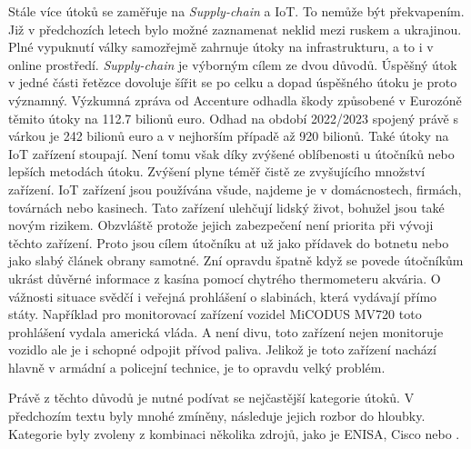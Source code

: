 Stále více útoků se zaměřuje na \textit{Supply-chain} a \ac{IoT}.
To nemůže být překvapením.
Již v předchozích letech bylo možné zaznamenat neklid mezi ruskem a ukrajinou.
Plné vypuknutí války samozřejmě zahrnuje útoky na infrastrukturu, a to i v online prostředí.
\textit{Supply-chain} je výborným cílem ze dvou důvodů.
Úspěšný útok v jedné části řetězce dovoluje šířit se po celku a dopad úspěšného útoku je proto významný.
Výzkumná zpráva od Accenture\cite{accenture_supply-chain-disruption} odhadla škody způsobené v Eurozóně těmito útoky na 112.7 bilionů euro.
Odhad na období 2022/2023 spojený právě s várkou je 242 bilionů euro a v nejhorším případě až 920 bilionů.
Také útoky na \ac{IoT} zařízení stoupají.
Není tomu však díky zvýšené oblíbenosti u útočníků nebo lepších metodách útoku.
Zvýšení plyne téměř čistě ze zvyšujícího množství zařízení.
\ac{IoT} zařízení jsou používána všude, najdeme je v domácnostech, firmách, továrnách nebo kasinech.
Tato zařízení ulehčují lidský život, bohužel jsou také novým rizikem.
Obzvláště protože jejich zabezpečení není priorita při vývoji těchto zařízení.
Proto jsou cílem útočníku at už jako přídavek do botnetu nebo jako slabý článek obrany samotné.
Zní opravdu špatně když se povede útočníkům ukrást důvěrné informace z kasína pomocí chytrého thermometeru akvária\cite{casino_thermometer}.
O vážnosti situace svědčí i veřejná prohlášení o slabinách, která vydávají přímo státy.
Například pro monitorovací zařízení vozidel MiCODUS MV720 toto prohlášení vydala americká vláda\cite{america_gov_advisories_micodus}.
A není divu, toto zařízení nejen monitoruje vozidlo ale je i schopné odpojit přívod paliva.
Jelikož je toto zařízení nachází hlavně v armádní a policejní technice, je to opravdu velký problém.\cite{securityintelligence_most_common_2022_attacks}

Právě z těchto důvodů je nutné podívat se nejčastější kategorie útoků.
V předchozím textu byly mnohé zmíněny, následuje jejich rozbor do hloubky.
Kategorie byly zvoleny z kombinaci několika zdrojů, jako je \ac{ENISA}\cite{Enisa_thread_landscape}, Cisco\cite{cisco_most_common_attack} nebo \cite{nist_risks}.

